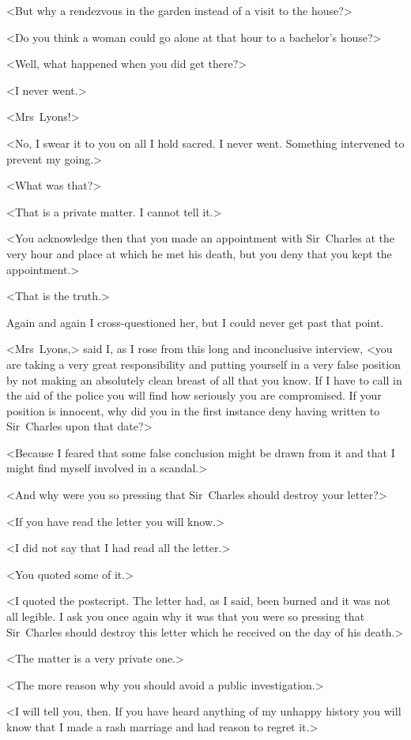 <But why a rendezvous in the garden instead of a visit to the house?>

<Do you think a woman could go alone at that hour to a bachelor's house?>

<Well, what happened when you did get there?>

<I never went.>

<Mrs~Lyons!>

<No, I swear it to you on all I hold sacred. I never went. Something intervened to prevent my going.>

<What was that?>

<That is a private matter. I cannot tell it.>

<You acknowledge then that you made an appointment with Sir~Charles at the very hour and place at which he met his death, but you deny that you kept the appointment.>

<That is the truth.>

Again and again I cross-questioned her, but I could never get past that point.

<Mrs~Lyons,> said I, as I rose from this long and inconclusive interview, <you are taking a very great responsibility and putting yourself in a very false position by not making an absolutely clean breast of all that you know. If I have to call in the aid of the police you will find how seriously you are compromised. If your position is innocent, why did you in the first instance deny having written to Sir~Charles upon that date?>

<Because I feared that some false conclusion might be drawn from it and that I might find myself involved in a scandal.>

<And why were you so pressing that Sir~Charles should destroy your letter?>

<If you have read the letter you will know.>

<I did not say that I had read all the letter.>

<You quoted some of it.>

<I quoted the postscript. The letter had, as I said, been burned and it was not all legible. I ask you once again why it was that you were so pressing that Sir~Charles should destroy this letter which he received on the day of his death.>

<The matter is a very private one.>

<The more reason why you should avoid a public investigation.>

<I will tell you, then. If you have heard anything of my unhappy history you will know that I made a rash marriage and had reason to regret it.>

